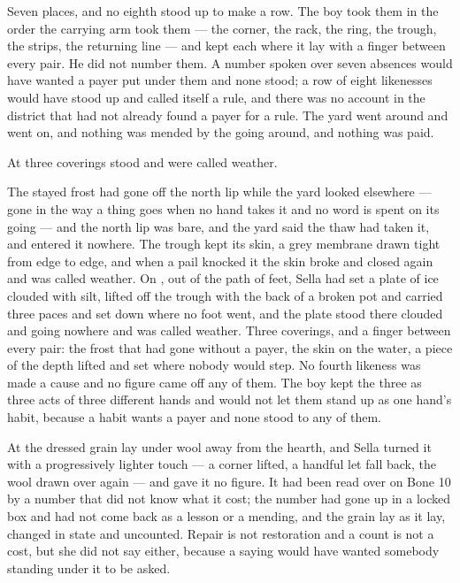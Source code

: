 Seven places, and no eighth stood up to make a row. The boy took them in the order the carrying arm took them --- the corner, the rack, the ring, the trough, the strips, the returning line --- and kept each where it lay with a finger between every pair. He did not number them. A number spoken over seven absences would have wanted a payer put under them and none stood; a row of eight likenesses would have stood up and called itself a rule, and there was no account in the district that had not already found a payer for a rule. The yard went around and went on, and nothing was mended by the going around, and nothing was paid.

At  three coverings stood and were called weather.

The stayed frost had gone off the north lip while the yard looked elsewhere --- gone in the way a thing goes when no hand takes it and no word is spent on its going --- and the north lip was bare, and the yard said the thaw had taken it, and entered it nowhere. The trough kept its skin, a grey membrane drawn tight from edge to edge, and when a pail knocked it the skin broke and closed again and was called weather. On , out of the path of feet, Sella had set a plate of ice clouded with silt, lifted off the trough with the back of a broken pot and carried three paces and set down where no foot went, and the plate stood there clouded and going nowhere and was called weather. Three coverings, and a finger between every pair: the frost that had gone without a payer, the skin on the water, a piece of the depth lifted and set where nobody would step. No fourth likeness was made a cause and no figure came off any of them. The boy kept the three as three acts of three different hands and would not let them stand up as one hand's habit, because a habit wants a payer and none stood to any of them.

At  the dressed grain lay under wool away from the hearth, and Sella turned it with a progressively lighter touch --- a corner lifted, a handful let fall back, the wool drawn over again --- and gave it no figure. It had been read over on Bone 10 by a number that did not know what it cost; the number had gone up  in a locked box and had not come back as a lesson or a mending, and the grain lay as it lay, changed in state and uncounted. Repair is not restoration and a count is not a cost, but she did not say either, because a saying would have wanted somebody standing under it to be asked.

